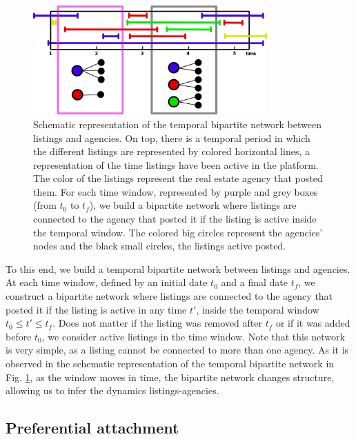 \begin{figure}
    \vspace{0.2 cm}
    \centering
    \includegraphics[width = 0.8\textwidth]{Figs/Idealista_dynamics/temporal_bipartite.pdf}
	\caption[Housing market as a temporal bipartite network.]{Schematic representation of the temporal bipartite network between listings and agencies. On top, there is a temporal period in which the different listings are represented by colored horizontal lines, a representation of the time listings have been active in the platform. The color of the listings represent the real estate agency that posted them. For each time window, represented by purple and grey boxes (from $t_0$ to $t_f$), we build a bipartite network where listings are connected to the agency that posted it if the listing is active inside the temporal window. The colored big circles represent the agencies' nodes and the black small circles, the listings active posted. \label{fig:temporal_bipartite}}
\end{figure}

To this end, we build a temporal bipartite network between listings and agencies. At each time window, defined by an initial date $t_0$ and a final date $t_f$, we construct a bipartite network where listings are connected to the agency that posted it if the listing is active in any time $t'$, inside the temporal window $t_0 \leq t' \leq t_f$. Does not matter if the listing was removed after $t_f$ or if it was added before $t_0$, we consider active listings in the time window. Note that this network is very simple, as a listing cannot be connected to more than one agency. As it is observed in the schematic representation of the temporal bipartite network in Fig. \ref{fig:temporal_bipartite}, as the window moves in time, the bipartite network changes structure, allowing us to infer the dynamics listings-agencies.



\subsection{Preferential attachment}

